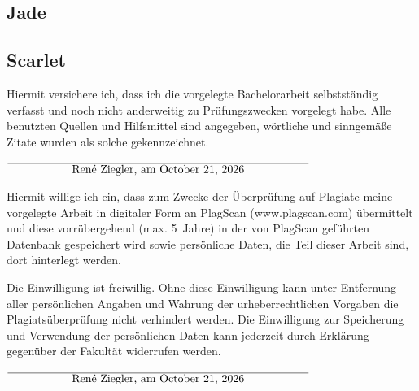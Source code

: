 \documentclass[12pt,oneside,a4paper,parskip]{scrbook}
\def\BaAuthor{René Ziegler}
\begin{document}
\subsection{Jade}
\subsection{Scarlet}


\backmatter

\listoffigures
{}

\listoftables


\printbibliography
{}



Hiermit versichere ich, dass ich die vorgelegte Bachelorarbeit selbstständig verfasst und noch nicht anderweitig zu Prüfungszwecken vorgelegt habe. Alle benutzten Quellen und Hilfsmittel sind angegeben, wörtliche und sinngemäße Zitate wurden als solche gekennzeichnet.

\vspace{20pt}
\begin{flushright}
$\overline{~~~~~~~~~~~~~~~~~\mbox{\BaAuthor, am \today}~~~~~~~~~~~~~~~~~}$
\end{flushright}


Hiermit willige ich ein, dass zum Zwecke der Überprüfung auf Plagiate meine vorgelegte Arbeit in digitaler Form an PlagScan (www.plagscan.com) übermittelt und diese vorrübergehend (max. 5~Jahre) in der von PlagScan geführten Datenbank gespeichert wird sowie persönliche Daten, die Teil dieser Arbeit sind, dort hinterlegt werden.

\begin{small}
Die Einwilligung ist freiwillig. Ohne diese Einwilligung kann unter Entfernung aller persönlichen Angaben und Wahrung der urheberrechtlichen Vorgaben die Plagiatsüberprüfung nicht verhindert werden. Die Einwilligung zur Speicherung und Verwendung der persönlichen Daten kann jederzeit durch Erklärung gegenüber der Fakultät widerrufen werden.
\end{small}

\vspace{20pt}
\begin{flushright}
$\overline{~~~~~~~~~~~~~~~~~\mbox{\BaAuthor, am \today}~~~~~~~~~~~~~~~~~}$
\end{flushright}
\end{document}
